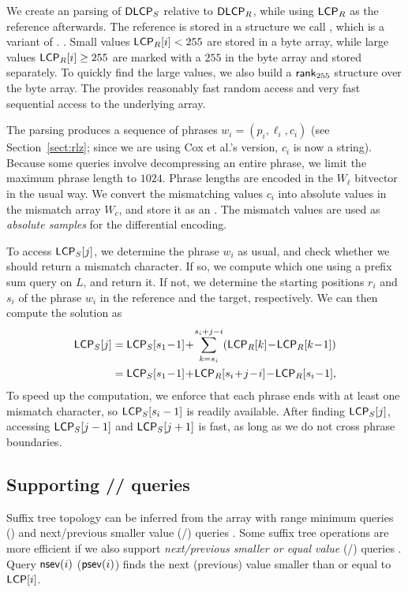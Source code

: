 We create an \RLZ{} parsing of $\mathsf{DLCP}_{S}$ relative to $\mathsf{DLCP}_{R}$, while
using $\mathsf{LCP}_{R}$ as the reference afterwards. The reference is stored in a
structure we call \slarray, which is a variant of \LCPbyte.
\cite{Abouelhoda2004}. Small values $\mathsf{LCP}_{R}[i] < 255$ are stored in a byte
array, while large values $\mathsf{LCP}_{R}[i] \ge 255$ are marked with a $255$ in the
byte array and stored separately. To quickly find the large values, we also
build a $\mathsf{rank}_{255}$ structure over the byte array. The \slarray{} provides
reasonably fast random access and very fast sequential access to the
underlying array.

The \RLZ{} parsing produces a sequence of phrases $w_{i} = (p_{i}, \ell_{i},
c_{i})$ (see Section~\ref{sect:rlz}; since we are using Cox et al.'s version, $c_{i}$ is now a string).
Because some queries involve decompressing an entire phrase, we limit the maximum phrase length to $1024$.
Phrase lengths are encoded in the $W_{\ell}$ bitvector in the usual way. We convert the mismatching \DLCP{}
values $c_{i}$ into absolute \LCP{} values in the mismatch array $W_{c}$, and
store it as an \slarray. The mismatch values are used as \emph{absolute
samples} for the differential encoding.

To access $\mathsf{LCP}_{S}[j]$, we determine the phrase $w_{i}$ as usual, and check whether we should return a mismatch character. If so, we compute which one using a prefix sum query on $L$, and return it.  If not, we determine the starting positions $r_{i}$ and $s_{i}$ of the phrase $w_{i}$ in the reference and the target, respectively. We can then compute the solution as
\begin{align*}
\mLCP_{S}[j] &= \mLCP_{S}[s_1 \!-\! 1] \!+\! \sum_{k = s_i}^{s_i + j- i}
(\mLCP_{R}[k] \!-\! \mLCP_{R}[k\!-\!1]) \\
&= \mLCP_{S}[s_1 \!-\! 1] \!+\! \mLCP_{R}[s_i \!+\! j \!-\! i] \!-\! \mLCP_{R}[s_i \!-\! 1],
\end{align*}
To speed up the computation, we enforce that each \RLZ{} phrase ends with at least one mismatch character, so $\mathsf{LCP}_{S}[s_{i} - 1]$ is readily available. After finding $\mathsf{LCP}_{S}[j]$, accessing $\mathsf{LCP}_{S}[j-1]$ and $\mathsf{LCP}_{S}[j+1]$ is fast, as long as we do not cross phrase boundaries.

\subsection{Supporting \nsv/\psv/\rmq{} queries}

Suffix tree topology can be inferred from the \LCP{} array with range minimum
queries (\rmq) and next/previous smaller value (\nsv/\psv) queries
\cite{Fischer2009a}. Some suffix tree operations are more efficient
if we also support \emph{next/previous smaller or equal value} (\nsev/\psev)
queries \cite{Abeliuk2013}. Query $\mathsf{nsev}(i)$ ($\mathsf{psev}(i)$) finds the next
(previous) value smaller than or equal to $\mathsf{LCP}[i]$.

